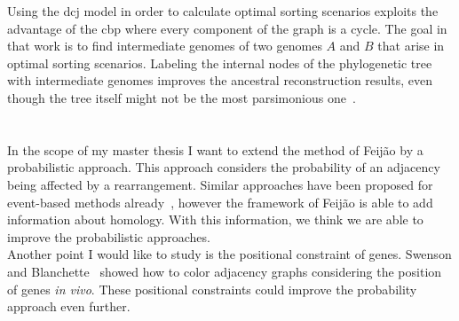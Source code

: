 Using the \gls{dcj} model in order to calculate optimal sorting scenarios exploits the advantage of the \gls{cbp}
where every component of the graph is a cycle.
The goal in that work is to find intermediate genomes of two genomes $A$ and $B$ that arise in optimal sorting scenarios.
Labeling the internal nodes of the phylogenetic tree with intermediate genomes improves the ancestral reconstruction results, even though the tree itself
might not be the most parsimonious one~\cite{Feijao2015}.
\\ \ \\
\\
In the scope of my master thesis I want to extend the method of Feijão by a probabilistic approach.
This approach considers the probability of an adjacency being affected by a rearrangement.
Similar approaches have been proposed for event-based methods already~\cite{Ma2006,Yang2014,Hu2013}, however the framework of Feijão is able to 
add information about homology. 
With this information, we think we are able to improve the probabilistic approaches.\\
Another point I would like to study is the positional constraint of genes.
Swenson and Blanchette~\cite{Swenson2015} showed how to color adjacency graphs considering the position of genes \emph{in vivo}.
These positional constraints could improve the probability approach even further.